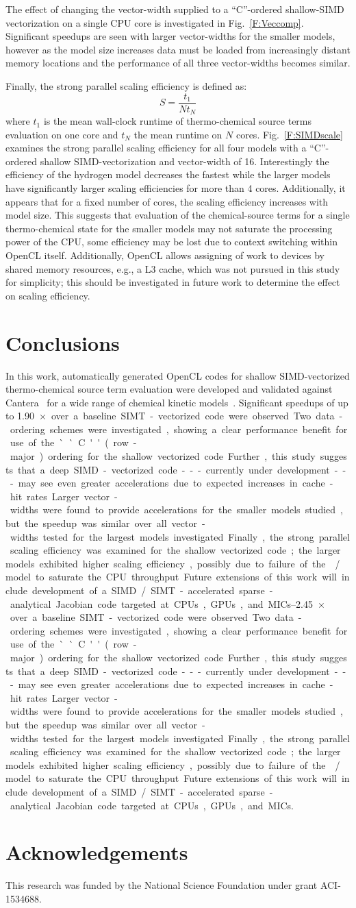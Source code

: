 \documentclass[12pt,number,sort&compress]{elsarticle}
\begin{document}
The effect of changing the vector-width supplied to a ``C''-ordered shallow-SIMD vectorization on a single CPU core is investigated in Fig.~\ref{F:Veccomp}.
Significant speedups are seen with larger vector-widths for the smaller models, however as the model size increases data must be loaded from increasingly distant memory locations and the performance of all three vector-widths becomes similar.

Finally, the strong parallel scaling efficiency is defined as:
\begin{equation}
S = \frac{t_1}{N t_N}
\end{equation}
where $t_1$ is the mean wall-clock runtime of thermo-chemical source terms evaluation on one core and $t_N$ the mean runtime on $N$ cores.
Fig.~\ref{F:SIMDscale} examines the strong parallel scaling efficiency for all four models with a ``C''-ordered shallow SIMD-vectorization and vector-width of 16.
Interestingly the efficiency of the hydrogen model decreases the fastest while the larger models have significantly larger scaling efficiencies for more than 4 cores.
Additionally, it appears that for a fixed number of cores, the scaling efficiency increases with model size.
This suggests that evaluation of the chemical-source terms for a single thermo-chemical state for the smaller models may not saturate the processing power of the CPU, some efficiency may be lost due to context switching within OpenCL itself.
Additionally, OpenCL allows assigning of work to devices by shared memory resources, e.g., a L3 cache, which was not pursued in this study for simplicity; this should be investigated in future work to determine the effect on scaling efficiency.

\section{Conclusions}
In this work, automatically generated OpenCL codes for shallow SIMD-vectorized thermo-chemical source term evaluation were developed and validated against Cantera~\cite{Cantera} for a wide range of chemical kinetic models~\cite{Burke:2011fh,smith_gri-mech_30,Wang:2007,Sarathy:2013jr}.
Significant speedups of up to \SIrange{1.90}{2.45}{$\times$} over a baseline SIMT-vectorized code were observed.
Two data-ordering schemes were investigated, showing a clear performance benefit for use of the ``C'' (row-major) ordering for the shallow vectorized code.
Further, this study suggests that a deep SIMD-vectorized code---currently under development---may see even greater accelerations due to expected increases in cache-hit rates.
Larger vector-widths were found to provide accelerations for the smaller models studied, but the speedup was similar over all vector-widths tested for the largest models investigated.
Finally, the strong parallel scaling efficiency was examined for the shallow vectorized code; the larger models exhibited higher scaling efficiency, possibly due to failure of the \slash{} model to saturate the CPU throughput.
Future extensions of this work will include development of a SIMD\slash SIMT-accelerated sparse-analytical Jacobian code targeted at CPUs, GPUs, and MICs.

\section{Acknowledgements}
This research was funded by the National Science Foundation under grant ACI-1534688.


\end{document}
